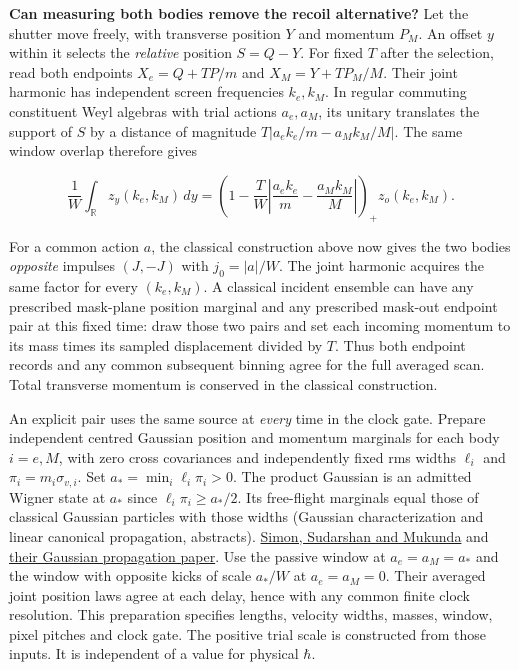 \documentclass[11pt,a4paper]{article}
\begin{document}
\textbf{Can measuring both bodies remove the recoil alternative?} Let
the shutter move freely, with transverse position \(Y\) and momentum
\(P_M\). An offset \(y\) within it selects the \emph{relative} position
\(S=Q-Y\). For fixed \(T\) after the selection, read both endpoints
\(X_e=Q+TP/m\) and \(X_M=Y+TP_M/M\). Their joint harmonic has
independent screen frequencies \(k_e,k_M\). In regular commuting
constituent Weyl algebras with trial actions \(a_e,a_M\), its unitary
translates the support of \(S\) by a distance of magnitude
\(T|a_e k_e/m-a_M k_M/M|\). The same window overlap therefore gives

\[
 \frac1W\int_{\mathbb R}z_y(k_e,k_M)\,dy
 =\left(1-\frac{T}{W}
    \left|\frac{a_e k_e}{m}-\frac{a_M k_M}{M}\right|\right)_+
    z_o(k_e,k_M).
\]

For a common action \(a\), the classical construction above now gives
the two bodies \emph{opposite} impulses \((J,-J)\) with \(j_0=|a|/W\).
The joint harmonic acquires the same factor for every \((k_e,k_M)\). A
classical incident ensemble can have any prescribed mask-plane position
marginal and any prescribed mask-out endpoint pair at this fixed time:
draw those two pairs and set each incoming momentum to its mass times
its sampled displacement divided by \(T\). Thus both endpoint records
and any common subsequent binning agree for the full averaged scan.
Total transverse momentum is conserved in the classical construction.

An explicit pair uses the same source at \emph{every} time in the clock
gate. Prepare independent centred Gaussian position and momentum
marginals for each body \(i=e,M\), with zero cross covariances and
independently fixed rms widths \(\ell_i\) and \(\pi_i=m_i\sigma_{v,i}\).
Set \(a_*=\min_i\ell_i\pi_i>0\). The product Gaussian is an admitted
Wigner state at \(a_*\) since \(\ell_i\pi_i\ge a_*/2\). Its free-flight
marginals equal those of classical Gaussian particles with those widths
(Gaussian characterization and linear canonical propagation, abstracts).
\href{https://doi.org/10.1016/0375-9601(87)90625-6}{Simon, Sudarshan and
Mukunda} and \href{https://doi.org/10.1103/PhysRevA.36.3868}{their
Gaussian propagation paper}. Use the passive window at \(a_e=a_M=a_*\)
and the window with opposite kicks of scale \(a_*/W\) at \(a_e=a_M=0\).
Their averaged joint position laws agree at each delay, hence with any
common finite clock resolution. This preparation specifies lengths,
velocity widths, masses, window, pixel pitches and clock gate. The
positive trial scale is constructed from those inputs. It is independent
of a value for physical \(\hbar\).
\end{document}
